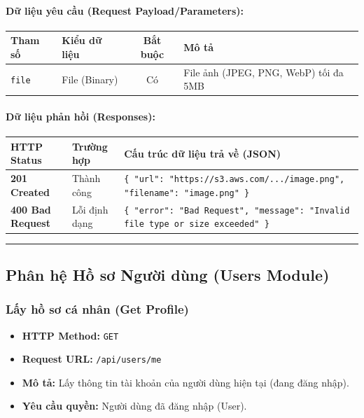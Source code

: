 \documentclass[12pt,a4paper]{article}
\begin{document}
\paragraph{Dữ liệu yêu cầu (Request Payload/Parameters):}
\begin{longtable}{|p{2.8cm}|p{2.2cm}|c|p{7.0cm}|}
\hline
\textbf{Tham số} & \textbf{Kiểu dữ liệu} & \textbf{Bắt buộc} & \textbf{Mô tả} \\ \hline
\endhead
\texttt{file} & File (Binary) & Có & File ảnh (JPEG, PNG, WebP) tối đa 5MB \\ \hline
\end{longtable}

\paragraph{Dữ liệu phản hồi (Responses):}
\begin{longtable}{|p{2.8cm}|p{3.2cm}|p{8.0cm}|}
\hline
\textbf{HTTP Status} & \textbf{Trường hợp} & \textbf{Cấu trúc dữ liệu trả về (JSON)} \\ \hline
\endhead
\textbf{201 Created} & Thành công & \texttt{\{ "url": "https://s3.aws.com/.../image.png", "filename": "image.png" \}} \\ \hline
\textbf{400 Bad Request} & Lỗi định dạng & \texttt{\{ "error": "Bad Request", "message": "Invalid file type or size exceeded" \}} \\ \hline
\end{longtable}

\vskip 0.4cm
\noindent\rule{\textwidth}{0.3pt}
\vskip 0.4cm

\subsection{Phân hệ Hồ sơ Người dùng (Users Module)}

\subsubsection{Lấy hồ sơ cá nhân (Get Profile)}
\begin{itemize}[leftmargin=*]
    \item \textbf{HTTP Method:} \texttt{GET}
    \item \textbf{Request URL:} \texttt{/api/users/me}
    \item \textbf{Mô tả:} Lấy thông tin tài khoản của người dùng hiện tại (đang đăng nhập).
    \item \textbf{Yêu cầu quyền:} Người dùng đã đăng nhập (User).
\end{itemize}
\end{document}

